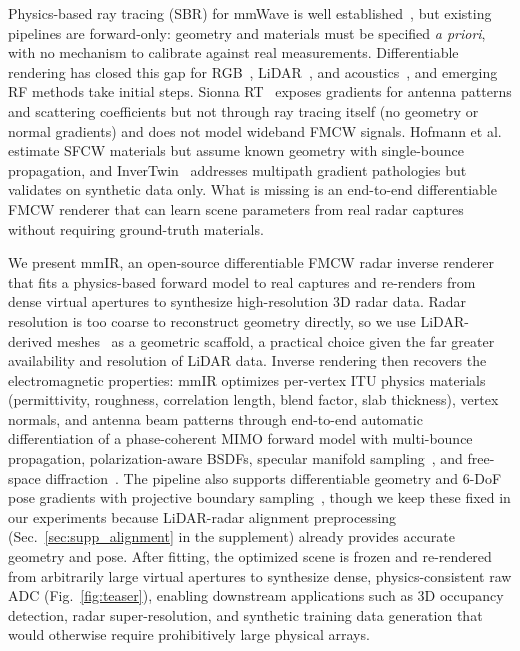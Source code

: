 Physics-based ray tracing (SBR) for mmWave is well established~\cite{dudek2010millimeter,sionna}, but existing pipelines are forward-only: geometry and materials must be specified \emph{a priori}, with no mechanism to calibrate against real measurements. Differentiable rendering has closed this gap for RGB~\cite{li2018differentiable, zhang2022iron}, LiDAR~\cite{kato2020differentiable}, and acoustics~\cite{jin2024diffsound}, and emerging RF methods take initial steps. Sionna RT~\cite{sionna} exposes gradients for antenna patterns and scattering coefficients but not through ray tracing itself (no geometry or normal gradients) and does not model wideband FMCW signals. Hofmann et al.~\cite{hofmann2025inverse} estimate SFCW materials but assume known geometry with single-bounce propagation, and InverTwin~\cite{chen2025invertwin} addresses multipath gradient pathologies but validates on synthetic data only. What is missing is an end-to-end differentiable FMCW renderer that can learn scene parameters from real radar captures without requiring ground-truth materials.

We present mmIR, an open-source differentiable FMCW radar inverse renderer that fits a physics-based forward model to real captures and re-renders from dense virtual apertures to synthesize high-resolution 3D radar data. Radar resolution is too coarse to reconstruct geometry directly, so we use LiDAR-derived meshes~\cite{kazhdan2006poisson} as a geometric scaffold, a practical choice given the far greater availability and resolution of LiDAR data. Inverse rendering then recovers the electromagnetic properties: mmIR optimizes per-vertex ITU physics materials (permittivity, roughness, correlation length, blend factor, slab thickness), vertex normals, and antenna beam patterns through end-to-end automatic differentiation of a phase-coherent MIMO forward model with multi-bounce propagation, polarization-aware BSDFs, specular manifold sampling~\cite{zeltner2020specular}, and free-space diffraction~\cite{steinberg2024fsd}. The pipeline also supports differentiable geometry and 6-DoF pose gradients with projective boundary sampling~\cite{zhang2023projective}, though we keep these fixed in our experiments because LiDAR-radar alignment preprocessing (Sec.~\ref{sec:supp_alignment} in the supplement) already provides accurate geometry and pose. After fitting, the optimized scene is frozen and re-rendered from arbitrarily large virtual apertures to synthesize dense, physics-consistent raw ADC (Fig.~\ref{fig:teaser}), enabling downstream applications such as 3D occupancy detection, radar super-resolution, and synthetic training data generation that would otherwise require prohibitively large physical arrays.


